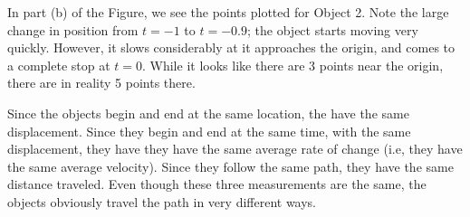 \documentclass{ximera}
\begin{document}
\begin{example}
\begin{explanation}
In part (b) of the Figure, we see the points plotted for Object
2. Note the large change in position from $t=-1$ to $t=-0.9$; the
object starts moving very quickly. However, it slows considerably at
it approaches the origin, and comes to a complete stop at $t=0$. While
it looks like there are 3 points near the origin, there are in reality
5 points there.

Since the objects begin and end at the same location, the have the
same displacement. Since they begin and end at the same time, with the
same displacement, they have they have the same average rate of change
(i.e, they have the same average velocity). Since they follow the same
path, they have the same distance traveled. Even though these three
measurements are the same, the objects obviously travel the path in
very different ways.
  \end{explanation}
\end{example}
\end{document}
